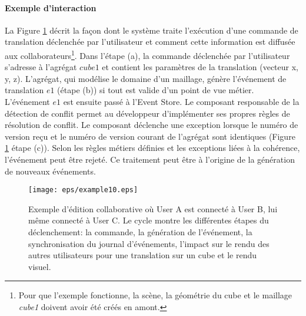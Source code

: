 \paragraph{Exemple d'interaction}
La Figure \ref{fig:cqrs-example} décrit la façon dont le système traite l'exécution 
d'une commande de translation déclenchée par l'utilisateur et comment cette 
information est diffusée aux collaborateurs\footnote{Pour que l'exemple 
fonctionne, la scène, la géométrie du cube et le maillage \textit{cube1} doivent 
avoir été créés en amont.}.
Dans l'étape (a), la commande déclenchée par l'utilisateur s'adresse à l'agrégat 
$cube1$ et contient les paramètres de la translation (vecteur x, y, z). L'agrégat, qui 
modélise le domaine d'un maillage, génère l'événement de translation $e1$ (étape 
(b)) si tout est valide d'un point de vue métier. L'événement $e1$ est ensuite 
passé à l'Event Store. 
Le composant responsable de la détection de conflit permet au développeur 
d'implémenter ses propres règles de résolution de conflit. Le composant déclenche 
une exception lorsque le numéro de version reçu et le numéro de version courant 
de l'agrégat sont identiques (Figure \ref{fig:cqrs-example} étape (c)). Selon les 
règles métiers définies et les exceptions liées à la cohérence, l'événement peut être 
rejeté. Ce traitement peut être à l'origine de la génération de nouveaux 
événements.


\begin{figure}[]
	\centering
	\texttt{[image: eps/example10.eps]}
	\caption[Flux de la collaboration dans le framework 3DEvent entre 3 
	utilisateurs]{Exemple d'édition collaborative où User A est connecté à User  B, 
		lui 
		même connecté à User C. Le cycle montre les différentes étapes du 
		déclenchement: la commande, la 
		génération 
		de l'événement, la 
		synchronisation du journal d'événements, l'impact sur le rendu des autres 
		utilisateurs pour une translation sur un cube et le rendu visuel.}\label{fig:cqrs-example}
\end{figure}

